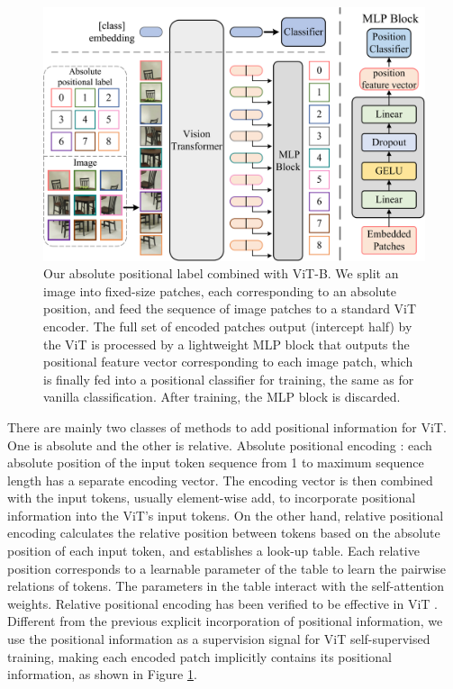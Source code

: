 \documentclass{article}
\begin{document}
\begin{figure}[t]
  \centering
   \includegraphics[width=1.0\linewidth]{AbsolutePosition.pdf}

   \caption{Our absolute positional label combined with ViT-B. We split an image into ﬁxed-size patches, each corresponding to an absolute position, and feed the sequence of image patches to a standard ViT encoder. The full set of encoded patches output (intercept half) by the ViT is processed by a lightweight MLP block that outputs the positional feature vector corresponding to each image patch, which is finally fed into a positional classifier for training, the same as for vanilla classification. After training, the MLP block is discarded.}
   \label{absolute position-flabel}
\end{figure}

There are mainly two classes of methods to add positional information for ViT. One is absolute and the other is relative. Absolute positional encoding \cite{pmlr-v70-gehring17a,Li_2018_CVPR}: each absolute position of the input token sequence from 1 to maximum sequence length has a separate encoding vector. The encoding vector is then combined with the input tokens, usually element-wise add, to incorporate positional information into the ViT's input tokens. On the other hand, relative positional encoding \cite{DBLP:journals/corr/abs-1901-02860,DBLP:journals/corr/abs-1803-02155} calculates the relative position between tokens based on the absolute position of each input token, and establishes a look-up table. Each relative position corresponds to a learnable parameter of the table to learn the pairwise relations of tokens. The parameters in the table interact with the self-attention weights. Relative positional encoding has been veriﬁed to be effective in ViT \cite{Wu_2021_ICCV}. Different from the previous explicit incorporation of positional information, we use the positional information as a supervision signal for ViT self-supervised training, making each encoded patch implicitly contains its positional information, as shown in Figure \ref{absolute position-flabel}.
\end{document}
